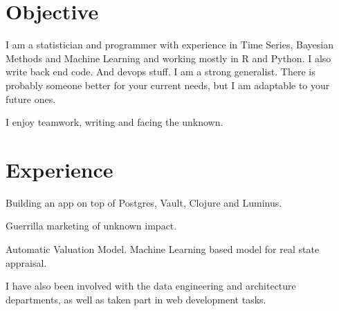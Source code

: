 \documentclass[]{deedy-resume-openfont}
\begin{document}
\hfill
\begin{minipage}[t]{0.66\textwidth} 


\section{Objective}
I am a statistician and programmer with experience in Time Series, Bayesian Methods and Machine Learning and working
mostly in R and Python. I also write back end code. And devops stuff. I am a strong generalist. 
There is probably someone better for your current needs, but I am adaptable to your future ones.

I enjoy teamwork, writing and facing the unknown.

\sectionsep


\section{Experience}

\vspace{\topsep} %
\begin{tightemize}
\item Building an app on top of Postgres, Vault, Clojure and Luminus.
\item Guerrilla marketing of unknown impact.
\end{tightemize}
\sectionsep

\vspace{\topsep} %
\begin{tightemize}
\item Automatic Valuation Model. Machine Learning based model for real state appraisal.
\item I have also been involved with the data engineering and architecture departments, 
as well as taken part in web development tasks.
\end{tightemize}
\sectionsep



\end{minipage}
\end{document}
